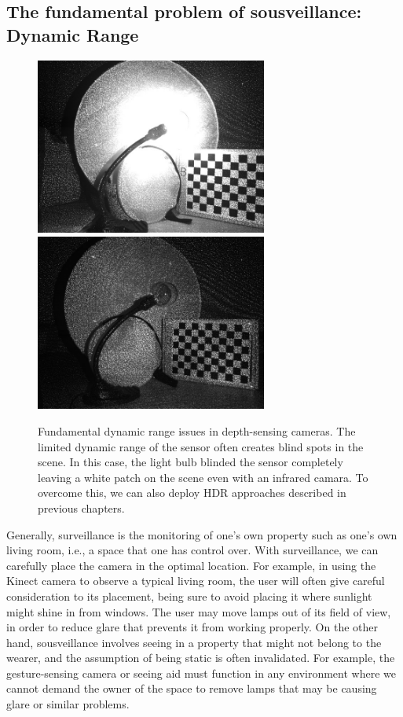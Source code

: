 \subsection{The fundamental problem of sousveillance: Dynamic Range}
\begin{figure}
\centering
\includegraphics[width=3.0in]{ch4/diagrams/high_expo_light.jpg} 
\includegraphics[width=3.0in]{ch4/diagrams/no_light_depth.jpg} \\
\caption{Fundamental dynamic range issues in depth-sensing cameras. The limited dynamic range 
of the sensor often creates blind spots in the scene. In this case, the light bulb blinded the sensor 
completely leaving a white patch on the scene even with an infrared camara. To overcome this, we 
can also deploy HDR approaches described in previous chapters.}
\label{fig:ir_range_issue}
\end{figure}

Generally, surveillance is the monitoring of one's own property such as one's own living room, i.e., 
a space that one has control over. With surveillance, we can carefully place the camera in the 
optimal location. For example, in using the Kinect camera to observe a typical living room, the user 
will often give careful consideration to its placement, being sure to avoid placing it where sunlight 
might shine in from windows. The user may move lamps out of its field of view, in order to reduce 
glare that prevents it from working properly.  On the other hand, sousveillance involves seeing in a 
property that might not belong to the wearer, and the assumption of being static is often 
invalidated. For example, the gesture-sensing camera or seeing aid must function in any 
environment where we cannot demand the owner of the space to remove lamps that may be 
causing glare or similar problems.

